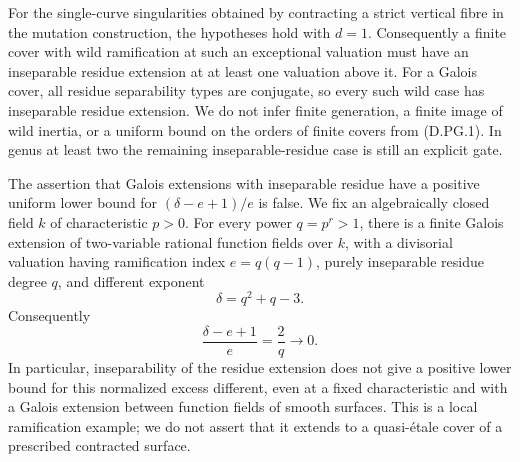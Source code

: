 \begin{remark}
For the single-curve singularities obtained by contracting a strict
vertical fibre in the mutation construction, the hypotheses hold
with $d=1$. Consequently a finite cover with wild ramification at
such an exceptional valuation must have an inseparable residue
extension at at least one valuation above it. For a Galois cover,
all residue separability types are conjugate, so every such wild
case has inseparable residue extension. We do not infer finite
generation, a finite image of wild inertia, or a uniform bound on
the orders of finite covers from (D.PG.1). In genus at least two
the remaining inseparable-residue case is still an explicit gate.
\end{remark}


\begin{example}
\label{D:fierce-small-excess}
The assertion that Galois extensions with inseparable residue have a
positive uniform lower bound for $(\delta-e+1)/e$ is false.
We fix an algebraically closed field $k$ of characteristic $p>0$.
For every power $q=p^r>1$, there is a finite Galois extension of
two-variable rational function fields over $k$, with a divisorial valuation
having ramification index $e=q(q-1)$, purely inseparable residue degree $q$,
and different exponent
\[
  \delta=q^2+q-3.
\]
Consequently
\[
  \frac{\delta-e+1}{e}=\frac2q\longrightarrow0.
\]
In particular, inseparability of the residue extension does not give a
positive lower bound for this normalized excess different, even at a fixed
characteristic and with a Galois extension between function fields of smooth
surfaces.  This is a local ramification example; we do not assert that it
extends to a quasi-\'etale cover of a prescribed contracted surface.
\end{example}

